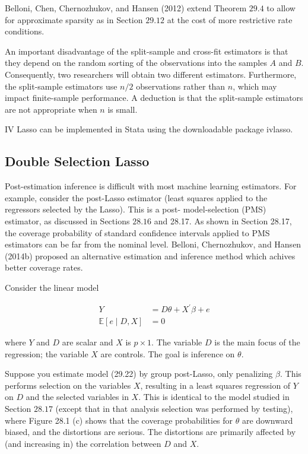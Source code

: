 \documentclass[10pt]{article}
\begin{document}
Belloni, Chen, Chernozhukov, and Hansen (2012) extend Theorem $29.4$ to allow for approximate sparsity as in Section $29.12$ at the cost of more restrictive rate conditions.

An important disadvantage of the split-sample and cross-fit estimators is that they depend on the random sorting of the observations into the samples $A$ and $B$. Consequently, two researchers will obtain two different estimators. Furthermore, the split-sample estimators use $n / 2$ observations rather than $n$, which may impact finite-sample performance. A deduction is that the split-sample estimators are not appropriate when $n$ is small.

IV Lasso can be implemented in Stata using the downloadable package ivlasso.

\subsection{Double Selection Lasso}
Post-estimation inference is difficult with most machine learning estimators. For example, consider the post-Lasso estimator (least squares applied to the regressors selected by the Lasso). This is a post- model-selection (PMS) estimator, as discussed in Sections $28.16$ and 28.17. As shown in Section 28.17, the coverage probability of standard confidence intervals applied to PMS estimators can be far from the nominal level. Belloni, Chernozhukov, and Hansen (2014b) proposed an alternative estimation and inference method which achives better coverage rates.

Consider the linear model

$$
\begin{aligned}
Y &=D \theta+X^{\prime} \beta+e \\
\mathbb{E}[e \mid D, X] &=0
\end{aligned}
$$

where $Y$ and $D$ are scalar and $X$ is $p \times 1$. The variable $D$ is the main focus of the regression; the variable $X$ are controls. The goal is inference on $\theta$.

Suppose you estimate model (29.22) by group post-Lasso, only penalizing $\beta$. This performs selection on the variables $X$, resulting in a least squares regression of $Y$ on $D$ and the selected variables in $X$. This is identical to the model studied in Section $28.17$ (except that in that analysis selection was performed by testing), where Figure 28.1 (c) shows that the coverage probabilities for $\theta$ are downward biased, and the distortions are serious. The distortions are primarily affected by (and increasing in) the correlation between $D$ and $X$.
\end{document}
